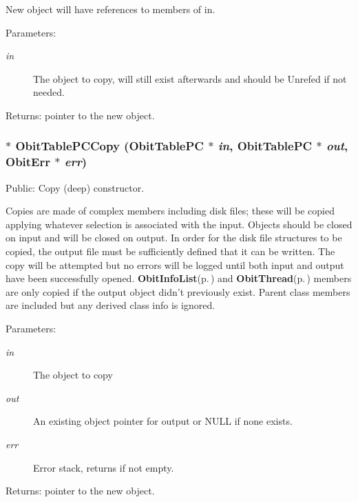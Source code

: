 New object will have references to members of in. \begin{Desc}
\item[Parameters:]
\begin{description}
\item[{\em in}]The object to copy, will still exist afterwards and should be Unrefed if not needed. \end{description}
\end{Desc}
\begin{Desc}
\item[Returns:]pointer to the new object. \end{Desc}
\subsubsection{$\ast$ Obit\-Table\-PCCopy ({\bf Obit\-Table\-PC} $\ast$ {\em in}, {\bf Obit\-Table\-PC} $\ast$ {\em out}, {\bf Obit\-Err} $\ast$ {\em err})}\label{ObitTablePC_8c_a20}


Public: Copy (deep) constructor. 

Copies are made of complex members including disk files; these will be copied applying whatever selection is associated with the input. Objects should be closed on input and will be closed on output. In order for the disk file structures to be copied, the output file must be sufficiently defined that it can be written. The copy will be attempted but no errors will be logged until both input and output have been successfully opened. {\bf Obit\-Info\-List}{\rm (p.\,\pageref{structObitInfoList})} and {\bf Obit\-Thread}{\rm (p.\,\pageref{structObitThread})} members are only copied if the output object didn't previously exist. Parent class members are included but any derived class info is ignored. \begin{Desc}
\item[Parameters:]
\begin{description}
\item[{\em in}]The object to copy \item[{\em out}]An existing object pointer for output or NULL if none exists. \item[{\em err}]Error stack, returns if not empty. \end{description}
\end{Desc}
\begin{Desc}
\item[Returns:]pointer to the new object. \end{Desc}

